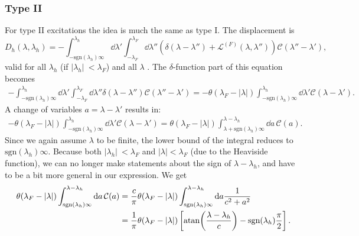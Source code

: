 \documentclass[11pt, a4paper]{report} %
\newcommand{\inversetruncc}{\mathcal{L}}
\newcommand{\kernel}{\mathcal{C}}
\begin{document}
\subsubsection{Type II}
For type II excitations the idea is much the same as type I. The displacement is
\begin{equation}
	D_h(\lambda, \lambda_h) = - \int_{-\textrm{sgn}(\lambda_h)\infty}^{\lambda_h} \dd \lambda' \int_{-\lambda_F}^{\lambda_F} \dd \lambda'' \left(\delta(\lambda-\lambda'') + \inversetruncc^{(F)}(\lambda,\lambda'') \right)\kernel(\lambda''-\lambda'),
\end{equation}
valid for all \(\lambda_h\) (if \(\lvert \lambda_h \rvert\ < \lambda_F\)) and all \(\lambda\) \cite{tofind}.
The \(\delta\)-function part of this equation becomes
\begin{align}
	-\int_{-\textrm{sgn}(\lambda_h)\infty}^{\lambda_h} \dd \lambda' \int_{-\lambda_F}^{\lambda_F} \dd \lambda'' \delta(\lambda-\lambda'') \kernel(\lambda''-\lambda') 
		= - \theta(\lambda_F - \lvert \lambda \rvert) \int_{-\textrm{sgn}(\lambda_h)\infty}^{\lambda_h} \dd \lambda'     \kernel(\lambda-\lambda').
\end{align}
A change of variables \(a=\lambda-\lambda'\) results in:
\begin{align}
	 - \theta(\lambda_F - \lvert \lambda \rvert) \int_{-\textrm{sgn}(\lambda_h)\infty}^{\lambda_h} \dd \lambda'     \kernel(\lambda-\lambda') = 
	  \theta(\lambda_F - \lvert \lambda \rvert) \int_{\lambda+\textrm{sgn}(\lambda_h)\infty}^{\lambda-\lambda_h} \dd a \, \kernel(a).
\end{align}
Since we again assume \(\lambda\) to be finite, the lower bound of the integral reduces to \(\textrm{sgn}(\lambda_h)\infty\).
Because both \({\lvert \lambda_h \rvert\ < \lambda_F}\) and \({\lvert\lambda\rvert < \lambda_F}\) (due to the Heaviside function), we can no longer make statements about the sign of \(\lambda-\lambda_h\), and have to be a bit more general in our expression.
We get
\begin{align}
	  \theta(\lambda_F - \lvert \lambda \rvert) \int_{\textrm{sgn}(\lambda_h)\infty}^{\lambda-\lambda_h} \dd a \, \kernel(a) &=
	  \frac{c}{\pi}\theta(\lambda_F - \lvert \lambda \rvert) \int_{\textrm{sgn}(\lambda_h)\infty}^{\lambda-\lambda_h} \dd a \frac{1}{c^2 + a^2}\\
	  &= \frac{1}{\pi}\theta(\lambda_F - \lvert \lambda \rvert) \left[ \atan(\frac{\lambda-\lambda_h}{c}) - \textrm{sgn}(\lambda_h)\frac{\pi}{2}\right].
\end{align}
\end{document}
